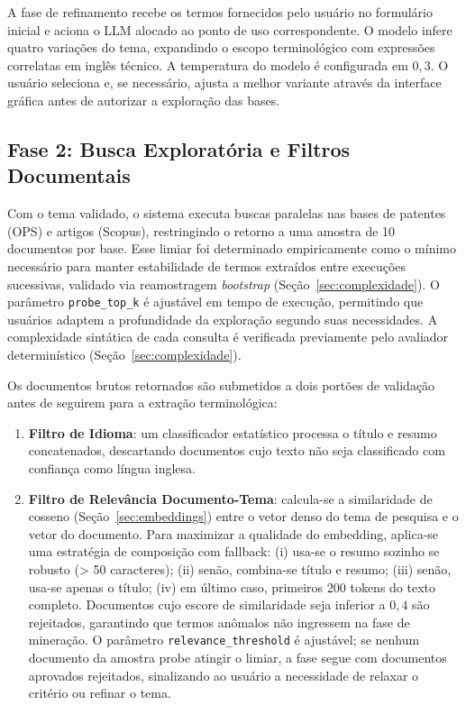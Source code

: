 \documentclass[12pt, a4paper]{article}
\begin{document}
  A fase de refinamento recebe os termos fornecidos pelo usuário no formulário inicial e aciona o LLM alocado ao ponto de uso correspondente. O modelo infere quatro variações do tema, expandindo o escopo terminológico com expressões correlatas em inglês técnico. A temperatura do modelo é configurada em $0{,}3$. O usuário seleciona e, se necessário, ajusta a melhor variante através da interface gráfica antes de autorizar a exploração das bases.

  \subsection{Fase 2: Busca Exploratória e Filtros Documentais}
  \label{sec:fase2}

  Com o tema validado, o sistema executa buscas paralelas nas bases de patentes (OPS) e artigos (Scopus), restringindo o retorno a uma amostra de 10 documentos por base. Esse limiar foi determinado empiricamente como o mínimo necessário para manter estabilidade de termos extraídos entre execuções sucessivas, validado via reamostragem \textit{bootstrap} (Seção~\ref{sec:complexidade}). O parâmetro \texttt{probe\_top\_k} é ajustável em tempo de execução, permitindo que usuários adaptem a profundidade da exploração segundo suas necessidades. A complexidade sintática de cada consulta é verificada previamente pelo avaliador determinístico (Seção~\ref{sec:complexidade}).

  Os documentos brutos retornados são submetidos a dois portões de validação antes de seguirem para a extração terminológica:
  \begin{enumerate}[label=(\alph*)]
    \item \textbf{Filtro de Idioma}: um classificador estatístico processa o título e resumo concatenados, descartando documentos cujo texto não seja classificado com confiança como língua inglesa.
    \item \textbf{Filtro de Relevância Documento-Tema}: calcula-se a similaridade de cosseno (Seção~\ref{sec:embeddings}) entre o vetor denso do tema de pesquisa e o vetor do documento. Para maximizar a qualidade do embedding, aplica-se uma estratégia de composição com fallback: (i) usa-se o resumo sozinho se robusto (> 50 caracteres); (ii) senão, combina-se título e resumo; (iii) senão, usa-se apenas o título; (iv) em último caso, primeiros 200 tokens do texto completo. Documentos cujo escore de similaridade seja inferior a $0{,}4$ são rejeitados, garantindo que termos anômalos não ingressem na fase de mineração. O parâmetro \texttt{relevance\_threshold} é ajustável; se nenhum documento da amostra probe atingir o limiar, a fase segue com documentos aprovados rejeitados, sinalizando ao usuário a necessidade de relaxar o critério ou refinar o tema.
  \end{enumerate}
\end{document}
